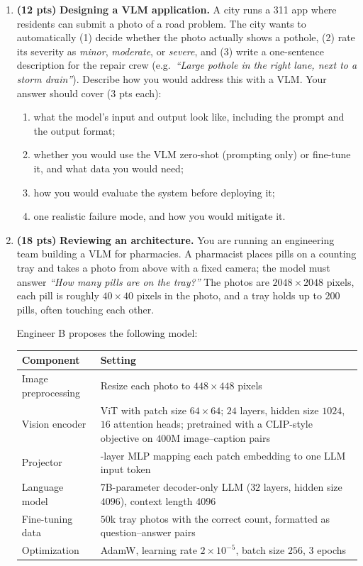 \documentclass[11pt]{article}
\begin{document}
\begin{enumerate}[label=(\alph*)]

  \item \textbf{(12 pts)} \textbf{Designing a VLM application.} A city runs a 311 app where residents can submit a
  photo of a road problem. The city wants to automatically (1) decide whether the photo actually shows a pothole,
  (2) rate its severity as \emph{minor}, \emph{moderate}, or \emph{severe}, and (3) write a one-sentence description
  for the repair crew (e.g.\ \emph{``Large pothole in the right lane, next to a storm drain''}). Describe how you
  would address this with a VLM. Your answer should cover (3 pts each):
  \begin{enumerate}[label=(\roman*)]
    \item what the model's input and output look like, including the prompt and the output format;
    \item whether you would use the VLM zero-shot (prompting only) or fine-tune it, and what data you would need;
    \item how you would evaluate the system before deploying it;
    \item one realistic failure mode, and how you would mitigate it.
  \end{enumerate}

  \item \textbf{(18 pts)} \textbf{Reviewing an architecture.} You are running an engineering team building a VLM
  for pharmacies. A pharmacist places pills on a counting tray and takes a photo from above with a fixed camera;
  the model must answer \emph{``How many pills are on the tray?''} The photos are $2048 \times 2048$ pixels, each
  pill is roughly $40 \times 40$ pixels in the photo, and a tray holds up to $200$ pills, often touching each other.

  \medskip
  Engineer B proposes the following model:
  \begin{center}
  \small
  \begin{tabular}{>{\raggedright\arraybackslash}p{4.4cm} >{\raggedright\arraybackslash}p{9.6cm}}
  \toprule
  Component & Setting\\
  \midrule
  Image preprocessing & Resize each photo to $448 \times 448$ pixels\\
  Vision encoder & ViT with patch size $64 \times 64$; $24$ layers, hidden size $1024$, $16$ attention heads;
  pretrained with a CLIP-style objective on $400$M image--caption pairs\\
  Projector & 2-layer MLP mapping each patch embedding to one LLM input token\\
  Language model & $7$B-parameter decoder-only LLM ($32$ layers, hidden size $4096$), context length $4096$\\
  Fine-tuning data & $50$k tray photos with the correct count, formatted as question--answer pairs\\
  Optimization & AdamW, learning rate $2 \times 10^{-5}$, batch size $256$, $3$ epochs\\
  \bottomrule
  \end{tabular}
  \end{center}


\end{enumerate}
\end{document}
